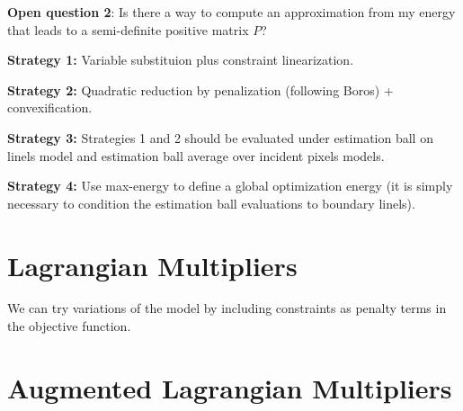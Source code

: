 	\textbf{Open question 2}: Is there a way to compute an approximation from my energy that leads to a semi-definite positive matrix $P$?
	
	\textbf{Strategy 1:} Variable substituion plus constraint linearization.
	
	\textbf{Strategy 2:} Quadratic reduction by penalization (following Boros) + convexification.
	
	\textbf{Strategy 3:} Strategies 1 and 2 should be evaluated under estimation ball on linels model and estimation ball average over incident pixels models.
	
	\textbf{Strategy 4:} Use max-energy to define a global optimization energy (it is simply necessary to condition the estimation ball evaluations to boundary linels).
	
	
\section{Lagrangian Multipliers}

	We can try variations of the model by including constraints as penalty terms in the objective function.
	
	
\section{Augmented Lagrangian Multipliers}	

